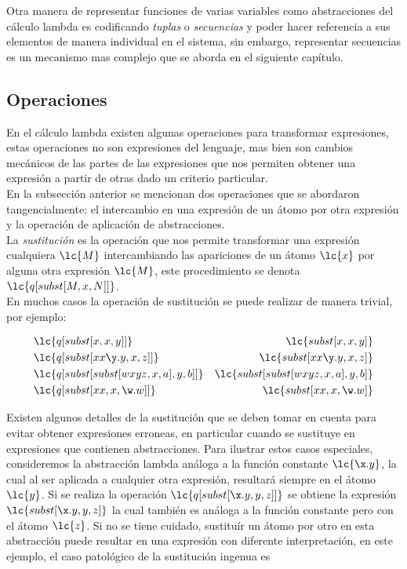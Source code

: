 Otra manera de representar funciones de varias variables como abstracciones del
cálculo lambda es codificando \emph{tuplas} o \emph{secuencias} y poder hacer
referencia a sus elementos de manera individual en el sistema, sin embargo,
representar secuencias es un mecanismo mas complejo que se aborda en el
siguiente capítulo. \\

\subsection{Operaciones}

En el cálculo lambda existen algunas operaciones para transformar expresiones,
estas operaciones no son expresiones del lenguaje, mas bien son cambios
mecánicos de las partes de las expresiones que nos permiten obtener una
expresión a partir de otras dado un criterio particular. \\

En la subsección anterior se mencionan dos operaciones que se abordaron
tangencialmente: el intercambio en una expresión de un átomo por otra expresión
y la operación de aplicación de abstracciones. \\

La \emph{sustitución} es la operación que nos permite transformar una expresión
cualquiera \(\lc{M}\) intercambiando las apariciones de un átomo \(\lc{x}\) por alguna
otra expresión \(\lc{M}\), este procedimiento se denota
\(\lc{q[subst[M,x,N]]}\). \\

En muchos casos la operación de sustitución se puede realizar de manera trivial,
por ejemplo:

\begin{align*}
  &\lc{q[subst[x, x, y]]} & \lc{subst[x, x, y]} \\
  &\lc{q[subst[x x \y.y, x, z]]} & \lc{subst[x x \y.y, x, z]} \\
  &\lc{q[subst[subst[w x y z,x,a],y,b]]} & \lc{subst[subst[w x y z,x,a],y,b]} \\
  &\lc{q[subst[x x, x, \w.w]]} & \lc{subst[x x, x, \w.w]} \\
\end{align*}

Existen algunos detalles de la sustitución que se deben tomar en cuenta para
evitar obtener expresiones erroneas, en particular cuando se sustituye en
expresiones que contienen abstracciones. Para ilustrar estos casos especiales,
consideremos la abstracción lambda análoga a la función constante \(\lc{\x.y}\),
la cual al ser aplicada a cualquier otra expresión, resultará siempre en el
átomo \(\lc{y}\). Si se realiza la operación \(\lc{q[subst[\x.y,y,z]]}\) se
obtiene la expresión \(\lc{subst[\x.y,y,z]}\) la cual también es análoga a la
función constante pero con el átomo \(\lc{z}\). Si no se tiene cuidado,
sustituír un átomo por otro en esta abstracción puede resultar en una expresión
con diferente interpretación, en este ejemplo, el caso patológico de la
sustitución ingenua es

